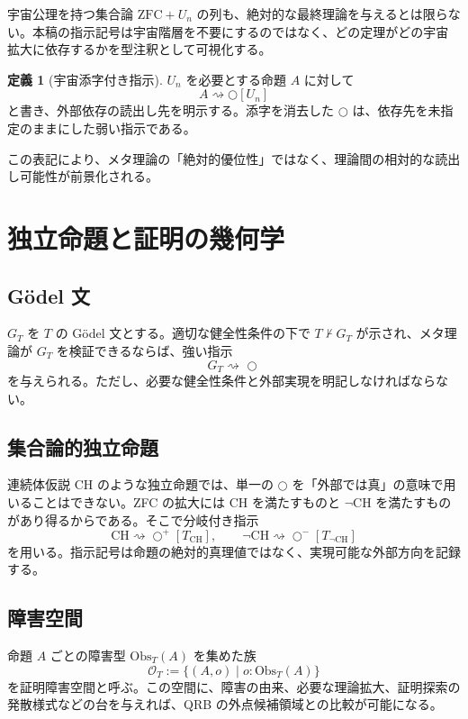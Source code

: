 \documentclass[a4paper,11pt]{ltjsarticle}
\theoremstyle{definition}
\newtheorem{definition}{定義}[section]
\theoremstyle{plain}
\newcommand{\dfix}{\bigcirc}
\newcommand{\Obs}{\mathrm{Obs}}
\begin{document}
宇宙公理を持つ集合論 $\mathrm{ZFC}+U_n$ の列も、絶対的な最終理論を与えるとは限らない。本稿の指示記号は宇宙階層を不要にするのではなく、どの定理がどの宇宙拡大に依存するかを型注釈として可視化する。

\begin{definition}[宇宙添字付き指示]
$U_n$ を必要とする命題 $A$ に対して
\[
 A\rightsquigarrow\dfix[U_n]
\]
と書き、外部依存の読出し先を明示する。添字を消去した $\dfix$ は、依存先を未指定のままにした弱い指示である。
\end{definition}

この表記により、メタ理論の「絶対的優位性」ではなく、理論間の相対的な読出し可能性が前景化される。

\section{独立命題と証明の幾何学}

\subsection{Gödel 文}

$G_T$ を $T$ の Gödel 文とする。適切な健全性条件の下で $T\nvdash G_T$ が示され、メタ理論が $G_T$ を検証できるならば、強い指示
\[
 G_T\rightsquigarrow_{\!}\dfix
\]
を与えられる。ただし、必要な健全性条件と外部実現を明記しなければならない。

\subsection{集合論的独立命題}

連続体仮説 CH のような独立命題では、単一の $\dfix$ を「外部では真」の意味で用いることはできない。ZFC の拡大には CH を満たすものと $\neg\mathrm{CH}$ を満たすものがあり得るからである。そこで分岐付き指示
\[
 \mathrm{CH}\rightsquigarrow\dfix^{+}[T_{\mathrm{CH}}],
 \qquad
 \neg\mathrm{CH}\rightsquigarrow\dfix^{-}[T_{\neg\mathrm{CH}}]
\]
を用いる。指示記号は命題の絶対的真理値ではなく、実現可能な外部方向を記録する。

\subsection{障害空間}

命題 $A$ ごとの障害型 $\Obs_T(A)$ を集めた族
\[
 \mathcal{O}_T:=\{(A,o)\mid o:\Obs_T(A)\}
\]
を証明障害空間と呼ぶ。この空間に、障害の由来、必要な理論拡大、証明探索の発散様式などの台を与えれば、QRB の外点候補領域との比較が可能になる。
\end{document}
